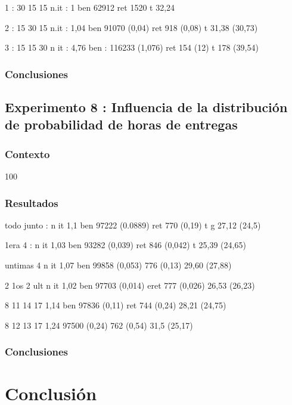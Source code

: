 \documentclass{article}
\begin{document}
1 : 30 15 15
n.it : 1
ben 62912
ret 1520
t 32,24

2 : 15 30 15
n.it : 1,04
ben 91070 (0,04)
ret 918 (0,08)
t 31,38 (30,73)

3 : 15 15 30
n it : 4,76
ben : 116233 (1,076)
ret 154 (12)
t 178 (39,54)

\subsubsection{Conclusiones}

\subsection{Experimento 8 : Influencia de la distribución de probabilidad
de horas de entregas}

\subsubsection{Contexto}
100

\subsubsection{Resultados}

todo junto :
n it 1,1
ben 97222 (0.0889)
ret 770 (0,19)
t g 27,12 (24,5)

1era 4 :
n it 1,03
ben 93282 (0,039)
ret 846 (0,042)
t 25,39 (24,65)

untimas 4
n it 1,07
ben 99858 (0,053)
776 (0,13)
29,60 (27,88)

2 1os 2 ult
n it 1,02
ben 97703 (0,014)
eret 777 (0,026)
26,53 (26,23)

8 11 14 17
1,14
ben 97836 (0,11)
ret 744 (0,24)
28,21 (24,75)

8 12 13 17
1,24
97500 (0,24)
762 (0,54)
31,5 (25,17)

\subsubsection{Conclusiones}

\section*{Conclusión}
\end{document}
